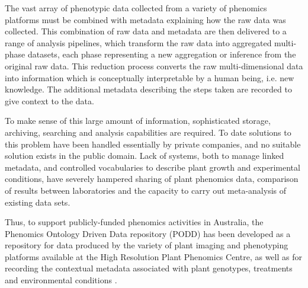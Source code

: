 \documentclass{llncs}
\begin{document}
The vast array of phenotypic data collected from a variety
of phenomics platforms must be combined with metadata explaining how the raw
data was collected. This combination of raw data and metadata are then delivered to a range of analysis pipelines, which transform the raw data into aggregated
multi-phase datasets, each phase representing a new aggregation or inference
from the original raw data. This reduction process converts the raw
multi-dimensional data into information which is conceptually interpretable by a
human being, i.e. new knowledge. The additional metadata describing the steps taken are recorded to give context to the data. 


To make sense of this large amount of information, sophisticated storage,
archiving, searching and analysis capabilities are required. To date solutions
to this problem have been handled essentially by private companies, and no
suitable solution exists in the public domain. Lack of systems, both to manage
linked metadata, and controlled vocabularies to describe plant growth and
experimental conditions, have severely hampered sharing of plant phenomics data,
comparison of results between laboratories and the capacity to carry out
meta-analysis of existing data sets.


Thus, to support publicly-funded phenomics activities in Australia, the
Phenomics Ontology Driven Data repository (PODD) has been developed as a
repository for data produced by the variety of plant imaging and phenotyping
platforms available at the High Resolution Plant Phenomics Centre, as well as
for recording the contextual metadata associated with plant genotypes,
treatments and environmental conditions \cite{Li2010}. 
\end{document}
